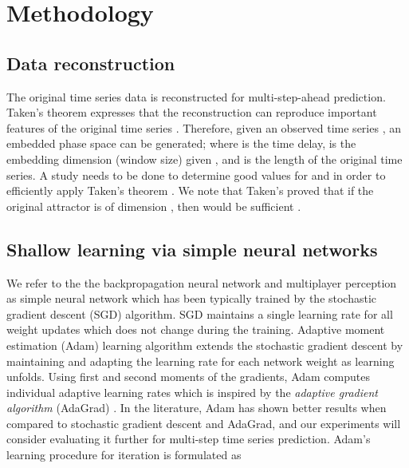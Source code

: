 \documentclass[final,5p,times,twocolumn]{elsarticle}
\begin{document}
\section{Methodology} 

\subsection{Data reconstruction }
   
The original time series data is reconstructed for    multi-step-ahead  
prediction. Taken's theorem expresses that the
reconstruction can reproduce  important
features  of the original time series  \cite{Takens1981}. Therefore, given an 
observed time series , an embedded  phase
space  can be generated; where  is the time delay,  is
the embedding dimension (window size) given , and  is the length 
of the
original time series. A study needs to be done to determine good values for  and 
 in order to efficiently apply Taken's theorem 
\cite{frazier2004}. We note that Taken's proved that if the original attractor is of
dimension , then  would be sufficient \cite{Takens1981}.    

 \subsection{Shallow learning via simple neural networks }
   


 
  
  


We refer to the the backpropagation neural network and multiplayer perception as simple neural network which has been typically trained by the stochastic gradient descent (SGD) algorithm. SGD maintains a single learning rate for all weight updates which does not change during the training. 
 Adaptive moment estimation (Adam) learning algorithm \cite{kingma2014adam} extends the  stochastic gradient descent by maintaining and adapting the learning rate  for each network weight  as learning unfolds. Using first and second moments of the gradients, Adam computes individual adaptive learning rates which is inspired by the \textit{adaptive gradient algorithm} (AdaGrad) \cite{duchi2011adaptive}.  In the literature, Adam has shown better results when compared to stochastic gradient descent and AdaGrad, and our experiments will consider evaluating it further for multi-step time series prediction.  Adam's learning procedure for  iteration    is formulated as
\end{document}
